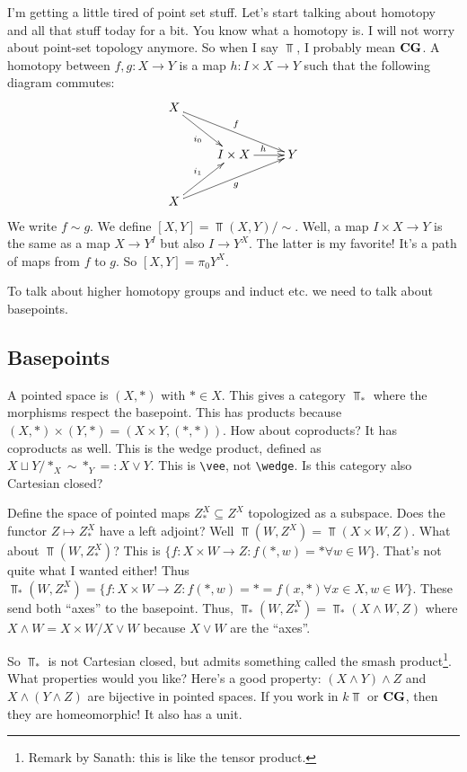 I'm getting a little tired of point set stuff. Let's start talking about homotopy and all that stuff today for a bit. You know what a homotopy is. I will not worry about point-set topology anymore. So when I say $\Top$, I probably mean $\mathbf{CG}$. A homotopy between $f,g:X\to Y$ is a map $h:I\times X\to Y$ such that the following diagram commutes:
\begin{equation*}
    \xymatrix{
	X\ar[dr]_{i_0}\ar[drr]^f & &\\
	& I\times X\ar[r]^h & Y\\
	X\ar[ur]^{i_1}\ar[urr]_g & &
    }
\end{equation*}
We write $f\sim g$. We define $[X,Y]=\Top(X,Y)/\sim$. Well, a map $I\times X\to Y$ is the same as a map $X\to Y^I$ but also $I\to Y^X$. The latter is my favorite! It's a path of maps from $f$ to $g$. So $[X,Y]=\pi_0Y^X$.

To talk about higher homotopy groups and induct etc. we need to talk about basepoints.
\subsection{Basepoints}
A pointed space is $(X,\ast)$ with $\ast\in X$. This gives a category $\Top_\ast$ where the morphisms respect the basepoint. This has products because $(X,\ast)\times (Y,\ast)=(X\times Y,(\ast,\ast))$. How about coproducts? It has coproducts as well. This is the wedge product, defined as $X\sqcup Y/\ast_X\sim \ast_Y=:X\vee Y$. This is \verb|\vee|, not \verb|\wedge|. Is this category also Cartesian closed?

Define the space of pointed maps $Z^X_\ast\subseteq Z^X$ topologized as a subspace. Does the functor $Z\mapsto Z^X_\ast$ have a left adjoint? Well $\Top(W,Z^X)=\Top(X\times W,Z)$. What about $\Top(W,Z^X_\ast)$? This is $\{f:X\times W\to Z:f(\ast,w)=\ast\forall w\in W\}$. That's not quite what I wanted either! Thus $\Top_\ast(W,Z^X_\ast)=\{f:X\times W\to Z:f(\ast,w)=\ast=f(x,\ast)\forall x\in X, w\in W\}$. These send both ``axes'' to the basepoint. Thus, $\Top_\ast(W,Z^X_\ast)=\Top_\ast(X\wedge W,Z)$ where $X\wedge W=X\times W/X\vee W$ because $X\vee W$ are the ``axes''.

So $\Top_\ast$ is not Cartesian closed, but admits something called the smash product\footnote{Remark by Sanath: this is like the tensor product.}. What properties would you like? Here's a good property: $(X\wedge Y)\wedge Z$ and $X\wedge(Y\wedge Z)$ are bijective in pointed spaces. If you work in $k\Top$ or $\mathbf{CG}$, then they are homeomorphic! It also has a unit.

